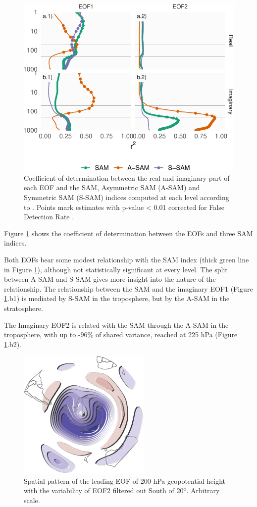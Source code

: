 \documentclass[smallextended]{svjour3}       %
\begin{document}
\begin{figure}
\centering
\includegraphics{../figures/sam-eof-vertical-1.pdf}
\caption{\label{fig:sam-eof-vertical}Coefficient of determination between the real and imaginary part of each EOF and the SAM, Asymmetric SAM (A-SAM) and Symmetric SAM (S-SAM) indices computed at each level according to \citet{campitelli2021}. Points mark estimates with p-value \textless{} 0.01 corrected for False Detection Rate \citep{benjamini1995}.}
\end{figure}

Figure \ref{fig:sam-eof-vertical} shows the coefficient of determination between the EOFs and three SAM indices.

Both EOFs bear some modest relationship with the SAM index (thick green line in Figure \ref{fig:sam-eof-vertical}), although not statistically significant at every level. The split between A-SAM and S-SAM gives more insight into the nature of the relationship. The relationship between the SAM and the imaginary EOF1 (Figure \ref{fig:sam-eof-vertical}.b1) is mediated by S-SAM in the troposphere, but by the A-SAM in the stratosphere.

The Imaginary EOF2 is related with the SAM through the A-SAM in the troposphere, with up to -96\% of shared variance, reached at 225 hPa (Figure \ref{fig:sam-eof-vertical}.b2).

\begin{figure}
\centering
\includegraphics{../figures/eof-filtered-1.pdf}
\caption{\label{fig:eof-filtered}Spatial pattern of the leading EOF of 200 hPa geopotential height with the variability of EOF2 filtered out South of 20º. Arbitrary scale.}
\end{figure}
\end{document}
